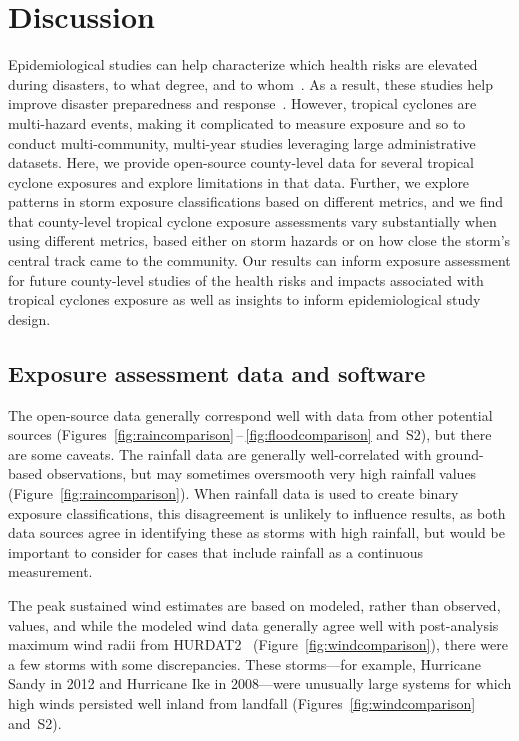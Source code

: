 \section*{Discussion}

Epidemiological studies can help characterize which health risks are elevated
during disasters, to what degree, and to
whom~\parencite{ibrahim2005unfortunate, noji2005disasters}.  As a result, these
studies help improve disaster preparedness and
response~\parencite{noji2005disasters}.  However, tropical cyclones are
multi-hazard events, making it complicated to measure exposure and so to
conduct multi-community, multi-year studies leveraging large administrative
datasets.  Here, we provide open-source county-level data for several tropical
cyclone exposures and explore limitations in that data.  
Further, we explore patterns in storm exposure classifications based on
different metrics, and we find that county-level tropical cyclone exposure
assessments vary substantially when using different metrics, based either on
storm hazards or on how close the storm's central track came to the community.
Our results can inform exposure assessment for future county-level studies of
the health risks and impacts associated with tropical cyclones exposure as
well as insights to inform epidemiological study design.  

\subsection*{Exposure assessment data and software}

The open-source data generally correspond well with data from other potential
sources (Figures~\ref{fig:raincomparison}\,--\,\ref{fig:floodcomparison}
and~S2), but there are some caveats. The rainfall data are generally
well-correlated with ground-based observations, but may sometimes oversmooth
very high rainfall values (Figure~\ref{fig:raincomparison}). When rainfall data
is used to create binary exposure classifications, this disagreement is
unlikely to influence results, as both data sources agree in identifying these
as storms with high rainfall, but would be important to consider for cases that
include rainfall as a continuous measurement. 

The peak sustained wind estimates are based on modeled, rather than observed,
values, and while the modeled wind data generally agree well with post-analysis
maximum wind radii from \ac{HURDAT2}~\parencite{landsea2013}
(Figure~\ref{fig:windcomparison}), there were a few storms with some
discrepancies. These storms---for example, Hurricane Sandy in 2012 and
Hurricane Ike in 2008---were unusually large systems for which high winds
persisted well inland from landfall (Figures~\ref{fig:windcomparison} and~S2). 

